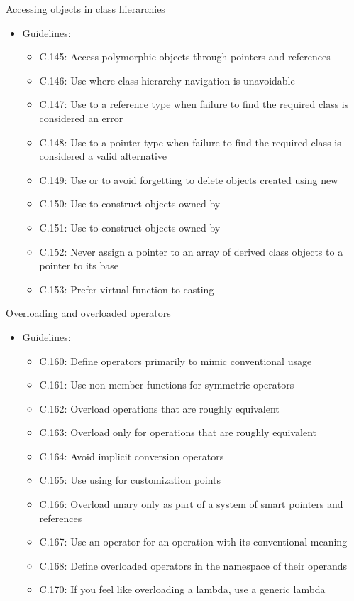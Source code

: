 \begin{frame}[t]{Accessing objects in class hierarchies}
\begin{itemize}
  \item Guidelines:
    \begin{itemize}\fontsize{9pt}{10pt}\selectfont
      \item C.145: Access polymorphic objects through pointers and references
      \item C.146: Use  where class hierarchy navigation is unavoidable
      \item C.147: Use  to a reference type when failure to find the required class is considered an error
      \item C.148: Use  to a pointer type when failure to find the required class is considered a valid alternative
      \item C.149: Use  or  to avoid forgetting to delete objects created using new
      \item C.150: Use  to construct objects owned by 
      \item C.151: Use  to construct objects owned by 
      \item C.152: Never assign a pointer to an array of derived class objects to a pointer to its base
      \item C.153: Prefer virtual function to casting
    \end{itemize}
\end{itemize}
\end{frame}

\begin{frame}[t]{Overloading and overloaded operators}
\begin{itemize}
  \item Guidelines:
    \begin{itemize}
      \item C.160: Define operators primarily to mimic conventional usage
      \item C.161: Use non-member functions for symmetric operators
      \item C.162: Overload operations that are roughly equivalent
      \item C.163: Overload only for operations that are roughly equivalent
      \item C.164: Avoid implicit conversion operators
      \item C.165: Use using for customization points
      \item C.166: Overload unary \cppkey{\&} only as part of a system of smart pointers and references
      \item C.167: Use an operator for an operation with its conventional meaning
      \item C.168: Define overloaded operators in the namespace of their operands
      \item C.170: If you feel like overloading a lambda, use a generic lambda
    \end{itemize}
\end{itemize}
\end{frame}

